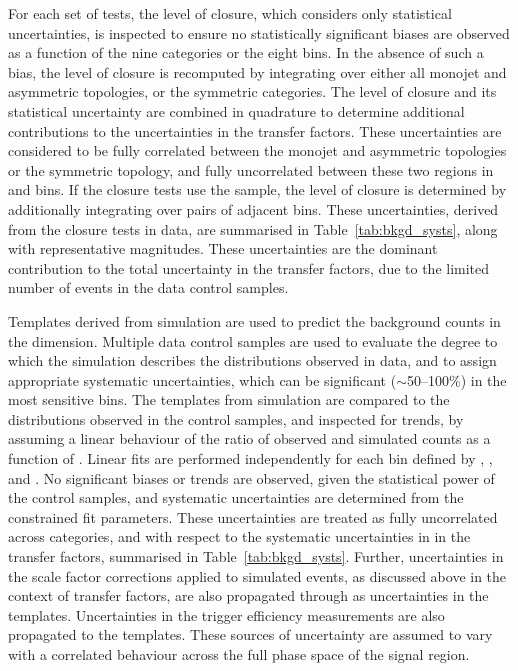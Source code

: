 For each set of tests, the level of closure, which considers only
statistical uncertainties, is inspected to ensure no statistically
significant biases are observed as a function of the nine \njet
categories or the eight \scalht bins. In the absence of such a bias,
the level of closure is recomputed by integrating over either all
monojet and asymmetric topologies, or the symmetric \njet
categories. The level of closure and its statistical uncertainty are
combined in quadrature to determine additional contributions to the
uncertainties in the transfer factors. These uncertainties are
considered to be fully correlated between the monojet and asymmetric
topologies or the symmetric topology, and fully uncorrelated between
these two regions in \njet and \scalht bins. If the closure tests use
the \mmj sample, the level of closure is determined by additionally
integrating over pairs of adjacent \scalht bins. These uncertainties,
derived from the closure tests in data, are summarised in
Table~\ref{tab:bkgd_systs}, along with representative
magnitudes. These uncertainties are the dominant contribution to the
total uncertainty in the transfer factors, due to the limited number
of events in the data control samples.

Templates derived from simulation are used to predict the background
counts in the \mht dimension. Multiple data control samples are used
to evaluate the degree to which the simulation describes the \mht
distributions observed in data, and to assign appropriate systematic
uncertainties, which can be significant ($\sim$50--100\%) in the most
sensitive \mht bins.  The \mht templates from simulation are compared
to the distributions observed in the control samples, and inspected
for trends, by assuming a linear behaviour of the ratio of observed
and simulated counts as a function of \HTmiss. Linear fits are
performed independently for each bin defined by \njet, \nb, and
\scalht. No significant biases or trends are observed, given the
statistical power of the control samples, and systematic uncertainties
are determined from the constrained fit parameters. These
uncertainties are treated as fully uncorrelated across categories, and
with respect to the systematic uncertainties in in the transfer
factors, summarised in Table~\ref{tab:bkgd_systs}. Further,
uncertainties in the scale factor corrections applied to simulated
events, as discussed above in the context of transfer factors, are
also propagated through as uncertainties in the \HTmiss
templates. Uncertainties in the trigger efficiency measurements are
also propagated to the \HTmiss templates. These sources of uncertainty
are assumed to vary with a correlated behaviour across the full phase
space of the signal region. 


